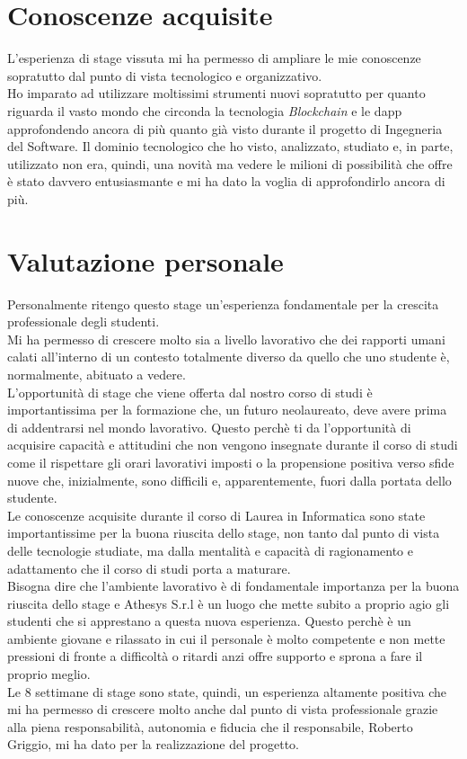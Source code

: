 \section{Conoscenze acquisite}
L'esperienza di stage vissuta mi ha permesso di ampliare le mie conoscenze sopratutto dal punto di vista tecnologico e organizzativo.\\
Ho imparato ad utilizzare moltissimi strumenti nuovi sopratutto per quanto riguarda il vasto mondo che circonda la tecnologia \textit{Blockchain} e le \gls{dapp} approfondendo ancora di più quanto già visto durante il progetto di Ingegneria del Software. Il dominio tecnologico che ho visto, analizzato, studiato e, in parte, utilizzato non era, quindi, una novità ma vedere le milioni di possibilità che offre è stato davvero entusiasmante e mi ha dato la voglia di approfondirlo ancora di più.
\section{Valutazione personale}
Personalmente ritengo questo stage un'esperienza fondamentale per la crescita professionale degli studenti.\\
Mi ha permesso di crescere molto sia a livello lavorativo che dei rapporti umani calati all'interno di un contesto totalmente diverso da quello che uno studente è, normalmente, abituato a vedere.\\
L'opportunità di stage che viene offerta dal nostro corso di studi è importantissima per la formazione che, un futuro neolaureato, deve avere prima di addentrarsi nel mondo lavorativo. Questo perchè ti da l'opportunità di acquisire capacità e attitudini che non vengono insegnate durante il corso di studi come il rispettare gli orari lavorativi imposti o la propensione positiva verso sfide nuove che, inizialmente, sono difficili e, apparentemente, fuori dalla portata dello studente.\\
Le conoscenze acquisite durante il corso di Laurea in Informatica sono state importantissime per la buona riuscita dello stage, non tanto dal punto di vista delle tecnologie studiate, ma dalla mentalità e capacità di ragionamento e adattamento che il corso di studi porta a maturare.\\
Bisogna dire che l'ambiente lavorativo è di fondamentale importanza per la buona riuscita dello stage e Athesys S.r.l è un luogo che mette subito a proprio agio gli studenti che si apprestano a questa nuova esperienza. Questo perchè è un ambiente giovane e rilassato in cui il personale è molto competente e non mette pressioni di fronte a difficoltà o ritardi anzi offre supporto e sprona a fare il proprio meglio.\\
Le 8 settimane di stage sono state, quindi, un esperienza altamente positiva che mi ha permesso di crescere molto anche dal punto di vista professionale grazie alla piena responsabilità, autonomia e fiducia che il responsabile, Roberto Griggio, mi ha dato per la realizzazione del progetto.